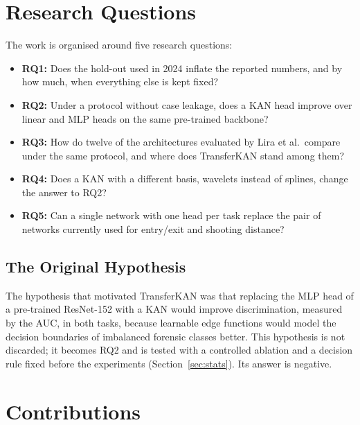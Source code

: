 \section{Research Questions}
\label{sec_goals}

The work is organised around five research questions:
\begin{itemize}
    \item \textbf{RQ1:} Does the hold-out used in 2024 inflate the reported numbers, and by how much, when everything else is kept fixed?
    \item \textbf{RQ2:} Under a protocol without case leakage, does a KAN head improve over linear and MLP heads on the same pre-trained backbone?
    \item \textbf{RQ3:} How do twelve of the architectures evaluated by Lira et al.\ compare under the same protocol, and where does TransferKAN stand among them?
    \item \textbf{RQ4:} Does a KAN with a different basis, wavelets instead of splines, change the answer to RQ2?
    \item \textbf{RQ5:} Can a single network with one head per task replace the pair of networks currently used for entry/exit and shooting distance?
\end{itemize}

\subsection{The Original Hypothesis}
\label{sec_hypothesis}

The hypothesis that motivated TransferKAN was that replacing the MLP head of a pre-trained ResNet-152 with a KAN would improve discrimination, measured by the AUC, in both tasks, because learnable edge functions would model the decision boundaries of imbalanced forensic classes better. This hypothesis is not discarded; it becomes RQ2 and is tested with a controlled ablation and a decision rule fixed before the experiments (Section~\ref{sec:stats}). Its answer is negative.

\section{Contributions}
\label{sec_contributions}

